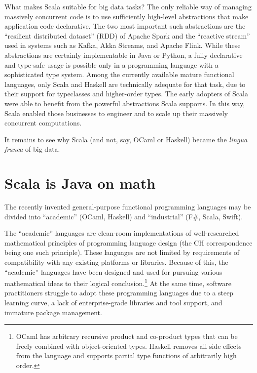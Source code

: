 What makes Scala suitable for big data tasks? The only reliable way
of managing massively concurrent code is to use sufficiently high-level
abstractions that make application code declarative. The two most
important such abstractions are the \textsf{``}resilient distributed dataset\textsf{''}
(RDD) of Apache Spark and the \textsf{``}reactive stream\textsf{''} used in systems
such as Kafka, Akka Streams, and Apache Flink. While these abstractions
are certainly implementable in Java or Python, a fully declarative
and type-safe usage is possible only in a programming language with
a sophisticated type system. Among the currently available mature
functional languages, only Scala and Haskell are technically adequate
for that task, due to their support for typeclasses and higher-order
types. The early adopters of Scala were able to benefit from the powerful
abstractions Scala supports. In this way, Scala enabled those businesses
to engineer and to scale up their massively concurrent computations.

It remains to see why Scala (and not, say, OCaml or Haskell) became
the \emph{lingua franca} of big data.

\section{Scala is Java on math }

The recently invented general-purpose functional programming languages
may be divided into \textsf{``}academic\textsf{''} (OCaml, Haskell) and \textsf{``}industrial\textsf{''}
(F\#, Scala, Swift).

The \textsf{``}academic\textsf{''} languages are clean-room implementations of well-researched
mathematical principles of programming language design (the CH correspondence
being one such principle). These languages are not limited by requirements
of compatibility with any existing platforms or libraries. Because
of this, the \textsf{``}academic\textsf{''} languages have been designed and used
for pursuing various mathematical ideas to their logical conclusion.\footnote{OCaml has arbitrary recursive product and co-product types that can
be freely combined with object-oriented types. Haskell removes all
side effects from the language and supports partial type functions
of arbitrarily high order.} At the same time, software practitioners struggle to adopt these
programming languages due to a steep learning curve, a lack of enterprise-grade
libraries and tool support, and immature package management.


